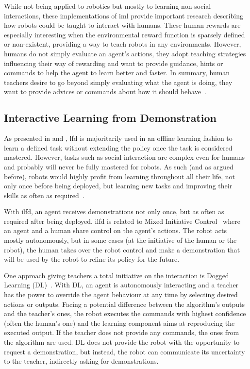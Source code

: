 While not being applied to robotics but mostly to learning non-social interactions, these implementations of \gls{iml} provide important research describing how robots could be taught to interact with humans. These human rewards are especially interesting when the environmental reward function is sparsely defined or non-existent, providing a way to teach robots in any environments. However, humans do not simply evaluate an agent's actions, they adopt teaching strategies influencing their way of rewarding and want to provide guidance, hints or commands to help the agent to learn better and faster. In summary, human teachers desire to go beyond simply evaluating what the agent is doing, they want to provide advices or commands about how it should behave~\citep{amershi2014power}.


\subsection{Interactive Learning from Demonstration} \label{ssec:back_ilfd}

As presented in \cite{argall2009survey} and \cite{billard2008robot}, \gls{lfd} is majoritarily used in an offline learning fashion to learn a defined task without extending the policy once the task is considered mastered. However, tasks such as social interaction are complex even for humans and probably will never be fully mastered for robots. As such (and as argued before), robots would highly profit from learning throughout all their life, not only once before being deployed, but learning new tasks and improving their skills as often as required~\citep{dautenhahn2004robots}.

With \gls{ilfd}, an agent receives demonstrations not only once, but as often as required after being deployed. \gls{ilfd} is related to Mixed Initiative Control~\citep{adams2004mixed} where an agent and a human share control on the agent's actions. The robot acts mostly autonomously, but in some cases (at the initiative of the human or the robot), the human takes over the robot control and make a demonstration that will be used by the robot to refine its policy for the future.

One approach giving teachers a total initiative on the interaction is Dogged Learning (DL)~\citep{grollman2007dogged}. With DL, an agent is autonomously interacting and a teacher has the power to override the agent behaviour at any time by selecting desired actions or outputs. Facing a potential difference between the algorithm's outputs and the teacher's ones, the robot executes the commands with highest confidence (often the human's one) and the learning component aims at reproducing the executed output. If the teacher does not provide any commands, the ones from the algorithm are used. DL does not provide the robot with the opportunity to request a demonstration, but instead, the robot can communicate its uncertainty to the teacher, indirectly asking for demonstrations. 

